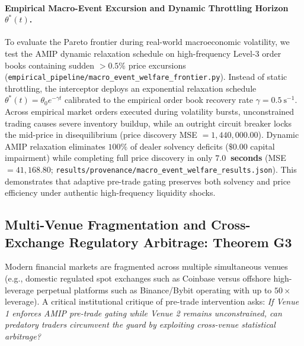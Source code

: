 \documentclass[10pt,twocolumn,letterpaper]{article}
\theoremstyle{definition}
\theoremstyle{remark}
\begin{document}
\paragraph{Empirical Macro-Event Excursion and Dynamic Throttling Horizon $\theta^*(t)$.}
To evaluate the Pareto frontier during real-world macroeconomic volatility, we test the AMIP dynamic relaxation schedule on high-frequency Level-3 order books containing sudden $>0.5\%$ price excursions (\texttt{empirical\_pipeline/macro\_event\_welfare\_frontier.py}). Instead of static throttling, the interceptor deploys an exponential relaxation schedule $\theta^*(t) = \theta_0 e^{-\gamma t}$ calibrated to the empirical order book recovery rate $\gamma = 0.5~\text{s}^{-1}$. Across empirical market orders executed during volatility bursts, unconstrained trading causes severe inventory buildup, while an outright circuit breaker locks the mid-price in disequilibrium (price discovery MSE $= 1{,}440{,}000.00$). Dynamic AMIP relaxation eliminates $100\%$ of dealer solvency deficits ($\$0.00$ capital impairment) while completing full price discovery in only \textbf{$7.0$~seconds} (MSE $= 41{,}168.80$; \texttt{results/provenance/macro\_event\_welfare\_results.json}). This demonstrates that adaptive pre-trade gating preserves both solvency and price efficiency under authentic high-frequency liquidity shocks.

\subsection{Multi-Venue Fragmentation and Cross-Exchange Regulatory Arbitrage: Theorem G3}
\label{sec:multi_venue_fragmentation}
Modern financial markets are fragmented across multiple simultaneous venues (e.g., domestic regulated spot exchanges such as Coinbase versus offshore high-leverage perpetual platforms such as Binance/Bybit operating with up to $50\times$ leverage). A critical institutional critique of pre-trade intervention asks: \emph{If Venue 1 enforces AMIP pre-trade gating while Venue 2 remains unconstrained, can predatory traders circumvent the guard by exploiting cross-venue statistical arbitrage?}
\end{document}
